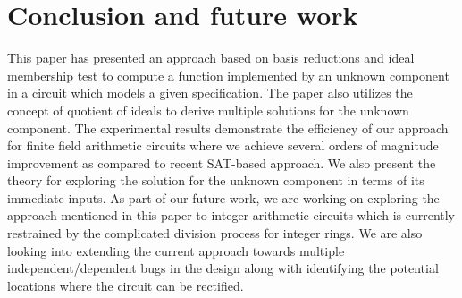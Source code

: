 \section{Conclusion and future work}
This paper has presented an approach based on \Grobner basis reductions and ideal
membership test to compute a function implemented by an unknown component in a circuit which models
a given specification. 
The paper also utilizes the concept of quotient of ideals to derive multiple solutions
for the unknown component. The experimental results demonstrate the efficiency of our approach 
for finite field arithmetic circuits where we achieve several orders of 
magnitude improvement as compared to recent SAT-based approach. 
We also present the theory for exploring the solution for the unknown 
component in terms of its immediate inputs.  
As part of our future work, we are working on exploring the approach mentioned in this paper  
to integer arithmetic circuits which is currently restrained by the complicated division process for integer rings. We are also looking into
extending the current approach towards
multiple independent/dependent bugs in the design along
with identifying the potential locations where the circuit can be rectified.
